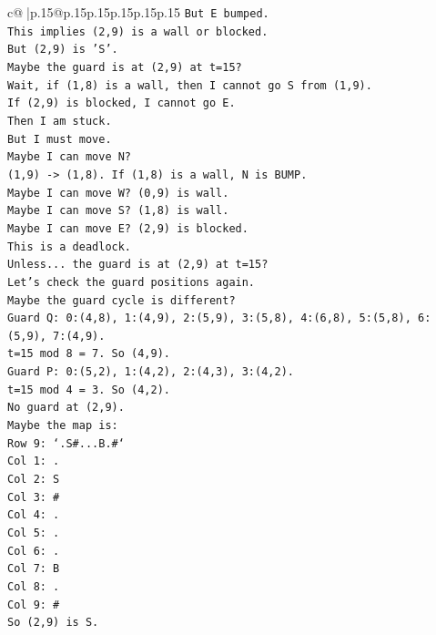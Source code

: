 \documentclass{article}
\begin{document}
{\begin{supertabular}{c@{$\;$}|p{.15\linewidth}@{}p{.15\linewidth}p{.15\linewidth}p{.15\linewidth}p{.15\linewidth}p{.15\linewidth}}
{{{\texttt{But E bumped.} \\
\texttt{This implies (2,9) is a wall or blocked.} \\
\texttt{But (2,9) is 'S'.} \\
\texttt{Maybe the guard is at (2,9) at t=15?} \\
\texttt{Wait, if (1,8) is a wall, then I cannot go S from (1,9).} \\
\texttt{If (2,9) is blocked, I cannot go E.} \\
\texttt{Then I am stuck.} \\
\texttt{But I must move.} \\
\texttt{Maybe I can move N?} \\
\texttt{(1,9) {-}> (1,8). If (1,8) is a wall, N is BUMP.} \\
\texttt{Maybe I can move W? (0,9) is wall.} \\
\texttt{Maybe I can move S? (1,8) is wall.} \\
\texttt{Maybe I can move E? (2,9) is blocked.} \\
\texttt{This is a deadlock.} \\
\texttt{Unless... the guard is at (2,9) at t=15?} \\
\texttt{Let's check the guard positions again.} \\
\texttt{Maybe the guard cycle is different?} \\
\texttt{Guard Q: 0:(4,8), 1:(4,9), 2:(5,9), 3:(5,8), 4:(6,8), 5:(5,8), 6:(5,9), 7:(4,9).} \\
\texttt{t=15 mod 8 = 7. So (4,9).} \\
\texttt{Guard P: 0:(5,2), 1:(4,2), 2:(4,3), 3:(4,2).} \\
\texttt{t=15 mod 4 = 3. So (4,2).} \\
\texttt{No guard at (2,9).} \\
\texttt{Maybe the map is:} \\
\texttt{Row 9: `.S\#...B.\#`} \\
\texttt{Col 1: .} \\
\texttt{Col 2: S} \\
\texttt{Col 3: \#} \\
\texttt{Col 4: .} \\
\texttt{Col 5: .} \\
\texttt{Col 6: .} \\
\texttt{Col 7: B} \\
\texttt{Col 8: .} \\
\texttt{Col 9: \#} \\
\texttt{So (2,9) is S.} \\
}}}
\end{supertabular}}
\end{document}
